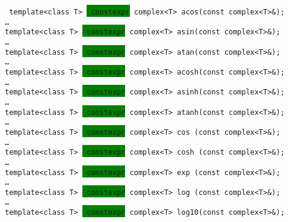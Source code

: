\documentclass[prd,twocolumn,amsmath,amssymb,nofootinbib,eqsecnum]{revtex4-1}
\newcommand{\code}[1]{{\tt #1}}
\newcommand{\highlight}[1]{\colorbox{green}{\!\!\!\! #1}}
\begin{document}
\code{
  	template<class T> \highlight{constexpr} complex<T> acos(const complex<T>\&);\\

	\ldots\\

	template<class T> \highlight{constexpr} complex<T> asin(const complex<T>\&);\\

	\ldots\\

	template<class T> \highlight{constexpr} complex<T> atan(const complex<T>\&);\\

	\ldots\\

  	template<class T> \highlight{constexpr} complex<T> acosh(const complex<T>\&);\\

	\ldots\\

	template<class T> \highlight{constexpr} complex<T> asinh(const complex<T>\&);\\

	\ldots\\

	template<class T> \highlight{constexpr} complex<T> atanh(const complex<T>\&);\\

	\ldots\\

	template<class T> \highlight{constexpr} complex<T> cos  (const complex<T>\&);\\

	\ldots\\

	template<class T> \highlight{constexpr} complex<T> cosh (const complex<T>\&);\\

	\ldots\\
	
	template<class T> \highlight{constexpr} complex<T> exp  (const complex<T>\&);\\

	\ldots\\

 	template<class T> \highlight{constexpr} complex<T> log  (const complex<T>\&);\\

	\ldots\\

	template<class T> \highlight{constexpr} complex<T> log10(const complex<T>\&);\\
	
}
\end{document}
